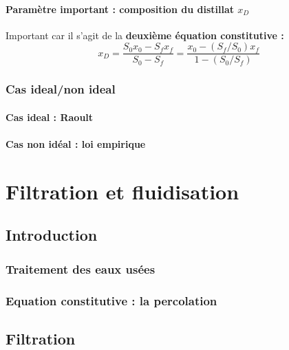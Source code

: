 \documentclass[11pt, a4paper, openany]{book}
\begin{document}
		\subsubsection{Paramètre important : composition du distillat $x_D$}
		Important car il s'agit de la \textbf{deuxième équation constitutive :}
		\begin{equation}
		x_D = \frac{S_0x_0-S_fx_f}{S_0-S_f} = \frac{x_0-(S_f/S_0)x_f}{1-(S_0/S_f)}
		\end{equation}
	
	\subsection{Cas ideal/non ideal}
		\subsubsection{Cas ideal : Raoult}
		
		\subsubsection{Cas non idéal : loi empirique}
		
	
	
	
	
	
	
	
	
	
	
	
	
	
	
	
	
	
	
	





\chapter{Filtration et fluidisation}
\section{Introduction}
	\subsection{Traitement des eaux usées}	
	\subsection{Equation constitutive : la percolation}
	
\section{Filtration}
\end{document}
